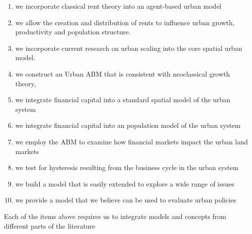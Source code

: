 \begin{enumerate}
    \item we incorporate \gls{classical rent theory} into an agent-based urban model 
    \item we allow the creation and distribution of rents to influence urban growth, productivity and  population structure. 
    \item we incorporate current research on \gls{urban scaling} into the  core spatial urban model.   
    \item we construct an   Urban \gls{ABM} that is consistent with \gls{neoclassical growth theory},
    \item we integrate \gls{financial capital} into a standard spatial model of the urban system
    \item we integrate financial capital into an population model of the urban system
    \item we employ the ABM to examine how financial markets impact the urban land markets 
    \item we test for \gls{hysteresis}  resulting from the business cycle  in the urban system 
    \item we build a model that is easily extended to explore a wide range of issues
    \item we provide a model that we believe can be used  to evaluate urban policies
\end{enumerate}


Each of the items above requires us to  integrate models and concepts from different parts of the literature


